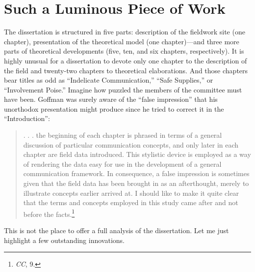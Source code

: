 \documentclass[openany,nobib]{tufte-book}
\begin{document}
\hypertarget{such-a-luminous-piece-of-work}{%
\section{Such a Luminous Piece of
Work}\label{such-a-luminous-piece-of-work}}

The dissertation is structured in five parts: description of the
fieldwork site (one chapter), presentation of the theoretical model (one
chapter)---and three more parts of theoretical developments (five, ten,
and six chapters, respectively). It is highly unusual for a dissertation
to devote only one chapter to the description of the field and
twenty-two chapters to theoretical elaborations. And those chapters bear
titles as odd as ``Indelicate Communication,'' ``Safe Supplies,'' or
``Involvement Poise.'' Imagine how puzzled the members of the committee
must have been. Goffman was surely aware of the ``false impression''
that his unorthodox presentation might produce since he tried to correct
it in the ``Introduction'':

\begin{quote}
. . . the beginning of each chapter is phrased in terms of a general
discussion of particular communication concepts, and only later in each
chapter are field data introduced. This stylistic device is employed as
a way of rendering the data easy for use in the development of a general
communication framework. In consequence, a false impression is sometimes
given that the field data has been brought in as an afterthought, merely
to illustrate concepts earlier arrived at. I should like to make it
quite clear that the terms and concepts employed in this study came
after and not before the facts.\footnote{\emph{CC}, 9.}
\end{quote}

\noindent This is not the place to offer a full analysis of the dissertation. Let
me just highlight a few outstanding innovations.
\end{document}
